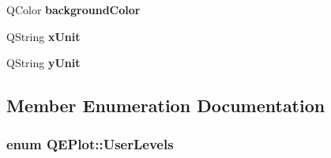 \begin{DoxyCompactItemize}
\item 
\hypertarget{classQEPlot_a17bcca54cf9104bc782012427f188556}{
QColor {\bfseries backgroundColor}}
\label{classQEPlot_a17bcca54cf9104bc782012427f188556}

\item 
\hypertarget{classQEPlot_a7eea8ec5e8abb8f343edba2caf476610}{
QString {\bfseries xUnit}}
\label{classQEPlot_a7eea8ec5e8abb8f343edba2caf476610}

\item 
\hypertarget{classQEPlot_a5dc996c9a3896e2688fdd99c1e8f5266}{
QString {\bfseries yUnit}}
\label{classQEPlot_a5dc996c9a3896e2688fdd99c1e8f5266}

\end{DoxyCompactItemize}


\subsection{Member Enumeration Documentation}
\hypertarget{classQEPlot_a3f70d3a05c74fdd4b58eaeed443bc323}{
\subsubsection[{UserLevels}]{\setlength{\rightskip}{0pt plus 5cm}enum {\bf QEPlot::UserLevels}}}
\label{classQEPlot_a3f70d3a05c74fdd4b58eaeed443bc323}
